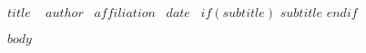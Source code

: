\documentclass[letterpaper,11pt,twoside]{memoir}
\begin{document}
  


\begin{flushleft}
\titlefont\normalsize{$title$} \
\vspace{.2cm}
\rmfamily\footnotesize{$author$} \
\rmfamily\footnotesize{$affiliation$}  \
\rmfamily\footnotesize{$date$} \
$if(subtitle)$
\vspace{.6cm}
\titlefont\LARGE{$subtitle$} 
$endif$
\end{flushleft}







$body$


\end{document}
